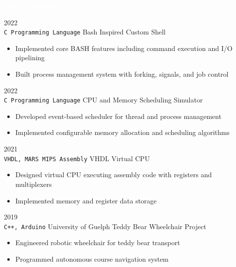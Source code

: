 \documentclass[9pt]{src/developercv} %
\begin{document}
\colorbox{sky700}{\textcolor{white}{\LARGE\MakeUppercase{\textbf{Past Projects}}}}\\%
\begin{entrylist}
	\entry
		{2022\\
		\small{\texttt{C Programming Language}}}
		{Bash Inspired Custom Shell}
		{}
		{
			\vspace{-1.0\baselineskip}
			\begin{itemize}
				\item Implemented core BASH features including command execution and I/O pipelining
				\item Built process management system with forking, signals, and job control
			\end{itemize}
		}
	\entry
		{2022\\
		\small{\texttt{C Programming Language}}}
		{CPU and Memory Scheduling Simulator}
		{}
		{
			\vspace{-1.0\baselineskip}
			\begin{itemize}
				\item Developed event-based scheduler for thread and process management
				\item Implemented configurable memory allocation and scheduling algorithms
			\end{itemize}
		}
	\entry
		{2021\\
		\small{\texttt{VHDL, MARS MIPS Assembly}}}
		{VHDL Virtual CPU}
		{}
		{
			\vspace{-1.0\baselineskip}
			\begin{itemize}
				\item Designed virtual CPU executing assembly code with registers and multiplexers
				\item Implemented memory and register data storage
			\end{itemize}
		}
	\entry
		{2019\\
		\small{\texttt{C++, Arduino}}}
		{University of Guelph Teddy Bear Wheelchair Project}
		{}
		{
			\vspace{-1.0\baselineskip}
			\begin{itemize}
				\item Engineered robotic wheelchair for teddy bear transport
				\item Programmed autonomous course navigation system
			\end{itemize}
		}
\end{entrylist}
\end{document}
